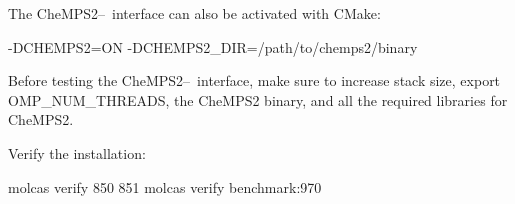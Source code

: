 The CheMPS2--\molcas\ interface can also be activated with CMake:

\begin{sourcelisting}
-DCHEMPS2=ON -DCHEMPS2_DIR=/path/to/chemps2/binary
\end{sourcelisting}


Before testing the CheMPS2--\molcas\ interface, make sure to increase stack size,
export OMP\_NUM\_THREADS, the CheMPS2 binary, and all the required libraries for CheMPS2.


Verify the installation:

\begin{sourcelisting}
 molcas verify 850 851
 molcas verify benchmark:970
\end{sourcelisting}

